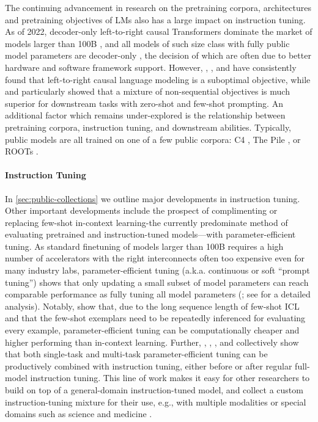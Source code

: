 The continuing advancement in research on the pretraining corpora, architectures and pretraining objectives of LMs also has a large impact on instruction tuning. As of 2022, decoder-only left-to-right causal Transformers dominate the market of models larger than 100B \citep{brown2020language,thoppilan2022lamda,rae2021scaling,chowdhery2022palm,hoffmann2022training}, and all models of such size class with fully public model parameters are decoder-only \citep{gpt-j,scao2022bloom,zhang2022opt}, the decision of which are often due to better hardware and software framework support. However, \citet{raffel2020exploring}, \citet{lewis-etal-2020-bart}, and \citet{tay2022unifying} have consistently found that left-to-right causal language modeling is a suboptimal objective, while \citet{tay2022transcending} and \citet{wang2022language} particularly showed that a mixture of non-sequential objectives is much superior for downstream tasks with zero-shot and few-shot prompting. An additional factor which remains under-explored is the relationship between pretraining corpora, instruction tuning, and downstream abilities. Typically, public models are all trained on one of a few public corpora: C4 \citep{raffel2020exploring}, The Pile \citep{gao2020pile}, or ROOTs \citep{laurencconbigscience}.

\paragraph{Instruction Tuning} In \ref{sec:public-collections} we outline major developments in instruction tuning. Other important developments include the prospect of complimenting or replacing few-shot in-context learning-the currently predominate method of evaluating pretrained and instruction-tuned models—with parameter-efficient tuning. As standard finetuning of models larger than 100B requires a high number of accelerators with the right interconnects often too expensive even for many industry labs, parameter-efficient tuning (a.k.a. continuous or soft “prompt tuning”) shows that only updating a small subset of model parameters can reach comparable performance as fully tuning all model parameters (\citealp{lester-etal-2021-power,vu-etal-2022-spot,lora}; see \citealp{he2022towards} for a detailed analysis). Notably, \citet{tfew2022} show that, due to the long sequence length of few-shot ICL and that the few-shot exemplars need to be repeatedly inferenced for evaluating every example, parameter-efficient tuning can be computationally cheaper and higher performing than in-context learning. Further, \citet{tfew2022}, \citet{vu-etal-2022-spot}, \citet{wei2021finetuned}, and \citet{med-palm} collectively show that both single-task and multi-task parameter-efficient tuning can be productively combined with instruction tuning, either before or after regular full-model instruction tuning. This line of work makes it easy for other researchers to build on top of a general-domain instruction-tuned model, and collect a custom instruction-tuning mixture for their use, e.g., with multiple modalities \citep{2022_palm_saycan,huang2022inner,multimodal-inst-tuning} or special domains such as science and medicine \citep{minerva,med-palm}. 


